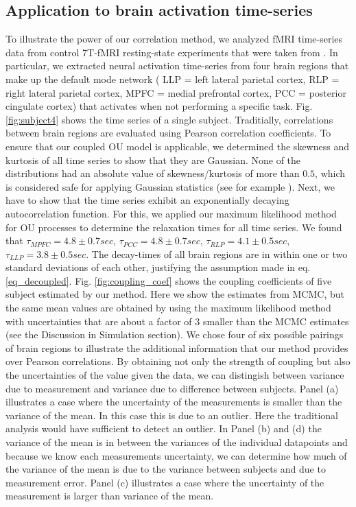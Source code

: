 \documentclass[%
 reprint,
 amsmath,amssymb,
 aps,
]{revtex4-1}
\begin{document}
\subsection{Application to brain activation time-series}
To illustrate the power of our correlation method, we analyzed fMRI time-series data from control 7T-fMRI resting-state experiments that were taken from \cite{RN98}.  In particular, we extracted neural activation time-series from four brain regions that make up the default mode network \cite{RN99} ( LLP = left lateral parietal cortex, RLP = right lateral parietal cortex, MPFC = medial prefrontal cortex, PCC = posterior cingulate cortex) that activates when not performing a specific task.  Fig. \ref{fig:subject4} shows the time series of a single subject.  Traditially, correlations between brain regions are evaluated using Pearson correlation coefficients.  To ensure that our coupled OU model is applicable, we determined the skewness and kurtosis of all time series to show that they are Gaussian.  None of the distributions had an absolute value of skewness/kurtosis of more than $0.5$, which is considered safe for applying Gaussian statistics (see for example \cite{RN100}).  Next, we have to show that the time series exhibit an exponentially decaying autocorrelation function.  For this, we applied our maximum likelihood method for OU processes to determine the relaxation times for all time series.  We found that $\tau_{MPFC}=4.8 \pm 0.7 sec$, $\tau_{PCC}=4.8 \pm 0.7 sec$, $\tau_{RLP}=4.1 \pm 0.5 sec$, $\tau_{LLP}=3.8 \pm 0.5 sec$.  The decay-times of all brain regions are in within one or two standard deviations of each other, justifying the assumption made in eq. \ref{eq_decoupled}.
Fig. \ref{fig:coupling_coef} shows the coupling coefficients of five subject estimated by our method.  Here we show the estimates from MCMC, but the same mean values are obtained by using the maximum likelihood method with uncertainties that are about a factor of 3 smaller than the MCMC estimates (see the Discussion in Simulation section).  We chose four of six possible pairings of brain regions to illustrate the additional information that our method provides over Pearson correlations.  By obtaining not only the strength of coupling but also the uncertainties of the value given the data, we can distingish between variance due to measurement and variance due to difference between subjects.  Panel (a) illustrates a case where the uncertainty of the measurements is smaller than the variance of the mean.  In this case this is due to an outlier.  Here the traditional analysis would have sufficient to detect an outlier.  In Panel (b) and (d) the variance of the mean is in between the variances of the individual datapoints and because we know each measurements uncertainty, we can determine how much of the variance of the mean is due to the variance between subjects and due to measurement error.  Panel (c) illustrates a case where the uncertainty of the measurement is larger than variance of the mean.
\end{document}
